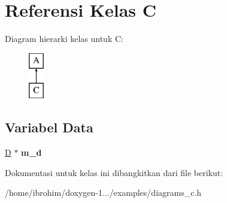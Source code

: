 \hypertarget{classC}{}\section{Referensi Kelas C}
\label{classC}
Diagram hierarki kelas untuk C\+:\begin{figure}[H]
\begin{center}
\leavevmode
\includegraphics[height=2.000000cm]{d9/d56/classC}
\end{center}
\end{figure}
\subsection*{Variabel Data}
\begin{DoxyCompactItemize}
\item 
\hypertarget{classC_a4ef972d28b73ff78eba3ab4f54c3b449}{}\hyperlink{classD}{D} $\ast$ {\bfseries m\+\_\+d}\label{classC_a4ef972d28b73ff78eba3ab4f54c3b449}

\end{DoxyCompactItemize}


Dokumentasi untuk kelas ini dibangkitkan dari file berikut\+:\begin{DoxyCompactItemize}
\item 
/home/ibrohim/doxygen-\/1.../examples/diagrams\+\_\+c.\+h\end{DoxyCompactItemize}
